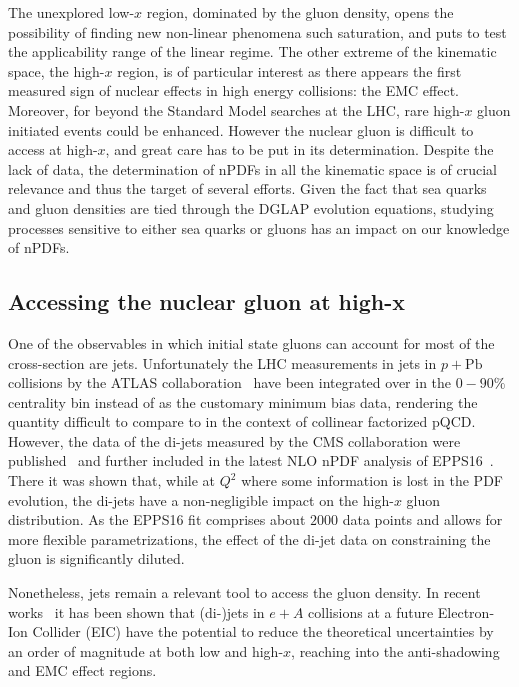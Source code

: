 The unexplored low-$x$ region, dominated by the gluon density, opens the possibility of finding new non-linear phenomena such saturation, and puts to test the applicability range of the linear regime. The other extreme of the kinematic space, the high-$x$ region, is of particular interest as there appears the first measured sign of nuclear effects in high energy collisions: the EMC effect. Moreover, for beyond the Standard Model searches at the LHC, rare high-$x$ gluon initiated events could be enhanced. However the nuclear gluon is difficult to access at high-$x$, and great care has to be put in its determination. Despite the lack of data, the determination of nPDFs in all the kinematic space is of crucial relevance and thus the target of several efforts. Given the fact that sea quarks and gluon densities are tied through the DGLAP evolution equations, studying processes sensitive to either sea quarks or gluons has an impact on our knowledge of nPDFs.    



\subsection{Accessing the nuclear gluon at high-x}

One of the observables in which initial state gluons can account for most of the cross-section are jets. Unfortunately the LHC measurements in jets in $p+\mathrm{Pb}$ collisions by the ATLAS collaboration~\cite{ATLAS:2014cpa} have been integrated over in the $0-90\%$ centrality bin instead of as the customary minimum bias data, rendering the quantity difficult to compare to in the context of collinear factorized pQCD. However, the data of the di-jets measured by the CMS collaboration were published~\cite{Chatrchyan:2014hqa} and further included in the latest NLO nPDF analysis of EPPS16~\cite{Eskola:2016oht}. There it was shown that, while at $Q^{2}$ where some information is lost in the PDF evolution, the di-jets have a non-negligible impact on the high-$x$ gluon distribution. As the EPPS16 fit comprises about $2000$ data points and allows for more flexible parametrizations, the effect of the di-jet data on constraining the gluon is significantly diluted. 

Nonetheless, jets remain a relevant tool to access the gluon density. In recent works~\cite{PhysRevD.95.094013, PhysRevD.97.114013} it has been shown that (di-)jets in $e+A$ collisions at a future Electron-Ion Collider (EIC) have the potential to reduce the theoretical uncertainties by an order of magnitude at both low and high-$x$, reaching into the anti-shadowing and EMC effect regions.

